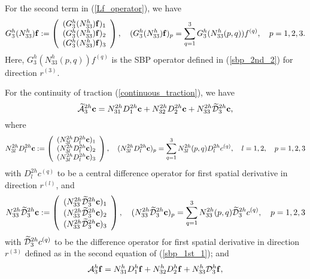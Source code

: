 For the second term in (\ref{Lf_operator}), we have
\begin{align*}\label{3_10_2}
{{G}}_3^{h}({N}_{33}^{h}){\bf f} := \left(\begin{array}{c}
({{G}}_3^{h}({N}_{33}^{h}){\bf f})_1 \\
({{G}}_3^{h}({N}_{33}^{h}){\bf f})_2 \\
({{G}}_3^{h}({N}_{33}^{h}){\bf f})_3 
\end{array}\right), \quad ({{G}}_3^{h}({N}_{33}^{h}){\bf f})_p = \sum_{q = 1}^{3} {G}_3^{h}(N_{33}^{h}(p,q)) {f}^{(q)},\quad p = 1,2,3.
\end{align*}
Here, ${G}_3^{h}(N_{33}^{h}(p,q)) {f}^{(q)}$ is the SBP operator defined in (\ref{sbp_2nd_2}) for direction $r^{(3)}$. 

For the continuity of traction (\ref{continuous_traction}), we have \[\widetilde{\mathcal{A}}^{2h}_3{\bf c} = N_{31}^{2h}D_1^{2h}{\bf c}+N_{32}^{2h}D_2^{2h}{\bf c}+N_{33}^{2h}\widetilde{\mathcal D}_3^{2h}{\bf c},\]
where
\begin{align*}\label{gamma_D} 
{N}_{3l}^{2h}D_l^{2h}{\bf c} := \left(\begin{array}{c}
({N}_{3l}^{2h}D_l^{2h}{\bf c})_1 \\
({N}_{3l}^{2h}D_l^{2h}{\bf c})_2 \\
({N}_{3l}^{2h}D_l^{2h}{\bf c})_3 
\end{array}\right), \quad ({N}_{3l}^{2h}D_l^{2h}{\bf c})_p = \sum_{q = 1}^{3} N_{3l}^{2h}(p,q)D_l^{2h}{c}^{(q)},\quad l = 1,2, \quad p = 1,2,3
\end{align*}
with $D_l^{2h}{c}^{(q)}$ to be a central difference operator for first spatial derivative in direction $r^{(l)}$, and
\begin{align*}\label{3_17}
{N}_{33}^{2h}\wt{\mathcal{D}}_3^{2h}{\bf c} := \left(\begin{array}{c}
({N}_{33}^{2h}\wt{\mathcal{D}}_3^{2h}{\bf c})_1 \\
({N}_{33}^{2h}\wt{\mathcal{D}}_3^{2h}{\bf c})_2 \\
({N}_{33}^{2h}\wt{\mathcal{D}}_3^{2h}{\bf c})_3 
\end{array}\right), \quad ({N}_{33}^{2h}\wt{\mathcal{D}}_3^{2h}{\bf c})_p = \sum_{q = 1}^{3} N_{33}^{2h}(p,q)\wt{\mathcal{D}}_3^{2h}{c}^{(q)},\quad p = 1,2,3
\end{align*}
with $\widetilde{\mathcal{D}}_3^{2h}{c}^{(q)}$ to be the difference operator for first spatial derivative in direction $r^{(3)}$ defined as in the second equation of (\ref{sbp_1st_1}); and 
\[\mathcal{A}_3^h{\bf f} = N_{31}^hD_1^h{\bf f}+N_{32}^hD_2^h{\bf f}+N_{33}^h\mathcal{D}_3^h{\bf f},\]

